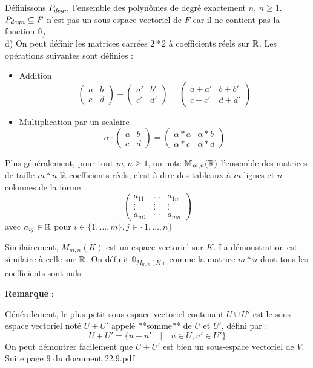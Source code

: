 \documentclass[12pt]{article}
\begin{document}
Définissons $P_{deg \space n}$ l'ensemble des polynômes de degré exactement $n$, $n \geq 1$.
$P_{deg \space n} \subseteq F$ n'est pas un sous-espace vectoriel de $F$ car il ne contient pas la fonction $\mathbb 0_f$.
\\
d) On peut définir les matrices carrées $2*2$ à coefficients réels sur $\mathbb{R}$. Les opérations suivantes sont définies :
\begin{itemize}
    \item Addition
    $$
    \begin{pmatrix}
    a & b \\ c & d
    \end{pmatrix} +\begin{pmatrix}
    a' & b' \\ c' & d'
    \end{pmatrix} = \begin{pmatrix}
    a+a' & b+b' \\ c+c' & d+d'
    \end{pmatrix}$$
    \item  Multiplication par un scalaire
    $$
    \alpha \cdot \begin{pmatrix}
    a & b \\ c & d
    \end{pmatrix} = \begin{pmatrix}
    \alpha * a &  \alpha *b \\ \alpha*c & \alpha*d
    \end{pmatrix}
    $$
\end{itemize}
Plus généralement, pour tout $m,n \geq 1$, on note $\mathbb M_{m,n}(\mathbb{R})$ l'ensemble des matrices de taille $m*n$ là coefficients réels, c'est-à-dire des tableaux à $m$ lignes et $n$ colonnes de la forme
$$\begin{pmatrix}
a_{11} & \dots & a_{1n} \\ \vdots & \vdots & \vdots
\\
a_{m1} & \cdots & a_{mn}
\end{pmatrix} 
$$
avec $a_{ij} \in \mathbb{R}$ pour $i \in \{1, \dots, m\}, j \in \{1, \dots, n\}$ 

Similairement, $M_{m,n}(K)$ est un espace vectoriel sur $K$. La démonstration est similaire à celle sur $\mathbb{R}$.
On définit $\mathbb 0_{M_{m,n}(K)}$ comme la matrice $m*n$ dont tous les coefficients sont nuls.

\textbf{Remarque} :

Généralement, le plus petit sous-espace vectoriel contenant $U \cup U'$ est le sous-espace vectoriel noté $U + U'$ appelé **somme** de $U$ et $U'$, défini par :
$$
U +U ' = \{u+u' \quad | \quad u \in U, u' \in U'\}$$
On peut démontrer facilement que $U+U'$ est bien un sous-espace vectoriel de $V$.
\\
Suite page 9 du document 22.9.pdf
\end{document}
